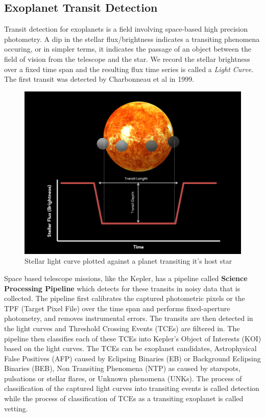 \subsection{Exoplanet Transit Detection}
Transit detection for exoplanets is a field involving space-based high precision photometry. A dip in the stellar flux/brightness indicates a transiting phenomena occuring, or in simpler terms, it indicates the passage of an object between the field of vision from the telescope and the star. We record the stellar brightness over a fixed time span and the resulting flux time series is called a \emph{Light Curve}. The first transit was detected by Charbonneau et al in 1999. 
\begin{figure}[h]
    \centering
    \includegraphics[scale=0.4]{Images/Transit.png}
    \caption{Stellar light curve plotted against a planet transiting it's host star}
    \label{fig:Transit}
\end{figure}

Space based telescope missions, like the Kepler, has a pipeline called \textbf{Science Processing Pipeline} which detects for these transits in noisy data that is collected. The pipeline first calibrates the captured photometric pixels or the TPF (Target Pixel File) over the time span and performs fixed-aperture photometry, and removes instrumental errors. The transits are then detected in the light curves and Threshold Crossing Events (TCEs) are filtered in. The pipeline then classifies each of these TCEs into Kepler's Object of Interests (KOI) based on the light curves. The TCEs can be exoplanet candidates, Astrophysical False Positives (AFP) caused by Eclipsing Binaries (EB) or Background Eclipsing Binaries (BEB), Non Transiting Phenomena (NTP) as caused by starspots, pulsations or stellar flares, or Unknown phenomena (UNKs). The process of classification of the captured light curves into transiting events is called detection while the process of classification of TCEs as a transiting exoplanet is called vetting.\\

